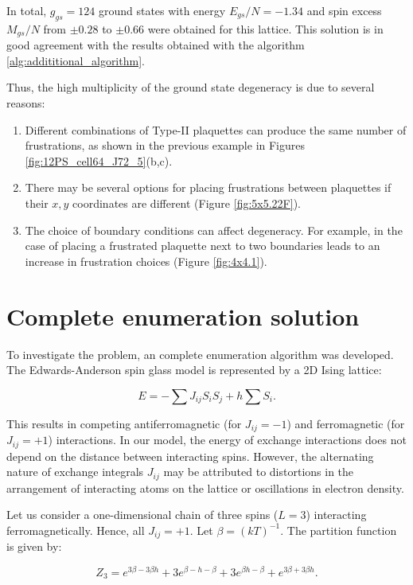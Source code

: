 \documentclass[utf8, babel, sor, jor, amsmath, amssymb, reprint]{elsarticle} %
\begin{document}
In total, $g_{gs}=124$ ground states with energy $E_{gs}/N=-1.34$ and spin excess $M_{gs}/N$ from $\pm 0.28$ to $\pm 0.66$ were obtained for this lattice. This solution is in good agreement with the results obtained with the algorithm \ref{alg:addititional_algorithm}.

Thus, the high multiplicity of the ground state degeneracy is due to several reasons:

\begin{enumerate}
	\item Different combinations of Type-II plaquettes can produce the same number of frustrations, as shown in the previous example in Figures \ref{fig:12PS_cell64_J72_5}(b,c).
	\item There may be several options for placing frustrations between plaquettes if their $x,y$ coordinates are different (Figure \ref{fig:5x5.22F}).
	\item The choice of boundary conditions can affect degeneracy. For example, in the case of placing a frustrated plaquette next to two boundaries leads to an increase in frustration choices (Figure \ref{fig:4x4.1}).
\end{enumerate}

\section{Complete enumeration solution}

To investigate the problem, an complete enumeration algorithm was developed.
The Edwards-Anderson spin glass model is represented by a 2D Ising lattice:

\begin{equation}
	E = -\sum J_{ij} S_i S_j + h \sum S_i.
	\label{eq:ising_energy}
\end{equation}

This results in competing antiferromagnetic (for $J_{ij} = -1$) and ferromagnetic (for $J_{ij} = +1$) interactions. In our model, the energy of exchange interactions does not depend on the distance between interacting spins. However, the alternating nature of exchange integrals $J_{ij}$ may be attributed to distortions in the arrangement of interacting atoms on the lattice or oscillations in electron density.

Let us consider a one-dimensional chain of three spins ($L = 3$) interacting ferromagnetically. Hence, all $J_{ij} = +1$. Let $\beta = (kT)^{-1}$. The partition function is given by:

\begin{equation}
	Z_3 = e^{3\beta - 3\beta h} + 3e^{\beta - h - \beta} + 3e^{\beta h - \beta} + e^{3\beta + 3\beta h}.
	\label{eq:stat_3}
\end{equation}
\end{document}
